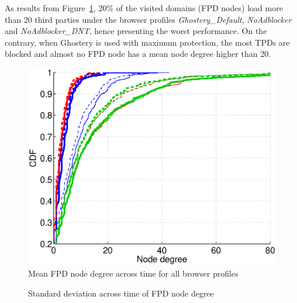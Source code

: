 As results from Figure~\ref{fig:cdf_mean_first_node_degree}, 20\% of the visited domains (FPD nodes) load more than 20 third parties under the browser profiles \textit{Ghostery\_Default}, \textit{NoAdblocker} and \textit{NoAdblocker\_DNT}, hence presenting the worst performance. On the contrary, when Ghostery is used with maximum protection, the most TPDs are blocked and almost no FPD node has a mean node degree higher than 20.

\begin{figure}
 \centering
  \includegraphics[width=.45\textwidth]{figures/cdf-scatterplot-means.eps}
  \caption{Mean FPD node degree across time for all browser profiles}
  \label{fig:cdf_mean_first_node_degree}
\end{figure}

\begin{figure}
 \centering
 
  \hfill
 
 \caption{Standard deviation across time of FPD node degree}
 \label{fig:stdev_first_node_degree}
\end{figure}

